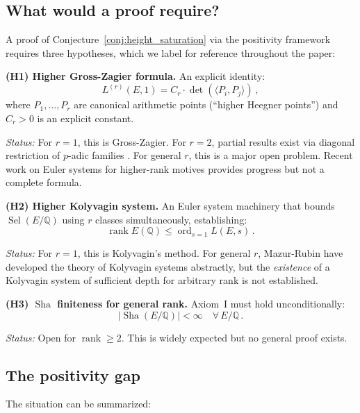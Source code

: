 \documentclass[aps,prd,twocolumn,superscriptaddress,nofootinbib]{revtex4-2}
\theoremstyle{definition}
\theoremstyle{remark}
\DeclareMathOperator{\ord}{ord}
\DeclareMathOperator{\rank}{rank}
\DeclareMathOperator{\Sel}{Sel}
\DeclareMathOperator{\Sha}{Sha}
\begin{document}
\subsection{What would a proof require?}

A proof of Conjecture~\ref{conj:height_saturation} via the positivity framework requires three hypotheses, which we label for reference throughout the paper:

\textbf{(H1) Higher Gross-Zagier formula.} An explicit identity:
\begin{equation}
L^{(r)}(E,1) = C_r \cdot \det\!\left(\langle P_i, P_j \rangle\right)\,,
\label{eq:higher_gz}
\end{equation}
where $P_1, \ldots, P_r$ are canonical arithmetic points (``higher Heegner points'') and $C_r > 0$ is an explicit constant.

\textit{Status:} For $r = 1$, this is Gross-Zagier. For $r = 2$, partial results exist via diagonal restriction of $p$-adic families \cite{DarmonRotger2017}. For general $r$, this is a major open problem. Recent work on Euler systems for higher-rank motives \cite{LSZ2020} provides progress but not a complete formula.

\textbf{(H2) Higher Kolyvagin system.} An Euler system machinery that bounds $\Sel(E/\mathbb{Q})$ using $r$ classes simultaneously, establishing:
\begin{equation}
\rank E(\mathbb{Q}) \leq \ord_{s=1} L(E,s)\,.
\end{equation}

\textit{Status:} For $r = 1$, this is Kolyvagin's method. For general $r$, Mazur-Rubin \cite{MazurRubin2004} have developed the theory of Kolyvagin systems abstractly, but the \textit{existence} of a Kolyvagin system of sufficient depth for arbitrary rank is not established.

\textbf{(H3) $\Sha$ finiteness for general rank.} Axiom~I must hold unconditionally:
\begin{equation}
|\Sha(E/\mathbb{Q})| < \infty \quad \forall\, E/\mathbb{Q}\,.
\end{equation}

\textit{Status:} Open for $\rank \geq 2$. This is widely expected but no general proof exists.

\subsection{The positivity gap}

The situation can be summarized:
\end{document}
